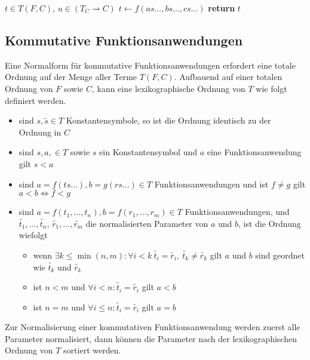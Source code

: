 \documentclass{article}
\begin{document}
\begin{algorithm}
\caption{$\mathrm{flatten} \colon T \times (T_C \rightharpoonup C) \rightarrow T$}\label{flatten}
\begin{algorithmic}[1] %
\Require $t \in T(F, C)$, $u \in (T_C \rightharpoonup C)$
		\State $t \leftarrow f(as..., bs..., cs...)$
	\EndWhile
\EndIf
\State \textbf{return} $t$ 
\end{algorithmic}
\end{algorithm}

\subsection{Kommutative Funktionsanwendungen}
Eine Normalform für kommutative Funktionsanwendungen erfordert eine totale Ordnung auf der Menge aller Terme $T(F, C)$. Aufbauend auf einer totalen Ordnung von $F$ sowie $C$, kann eine lexikographische Ordnung von $T$ wie folgt definiert werden. 
\begin{itemize}
	\item{sind $s, \tilde{s} \in T$ Konstantensymbole, so ist die Ordnung identisch zu der Ordnung in $C$}
	\item{sind $s, a, \in T$ sowie $s$ ein Konstantensymbol und $a$ eine Funktionsanwendung gilt $s < a$ }
	\item{sind $a = f(ts...), b = g(rs...) \in T$ Funktionsanwendungen und ist $f \neq g$ gilt $a < b \iff f < g $}
	\item{sind $a = f(t_1, \dots, t_n), b = f(r_1, \dots, r_m) \in T$ Funktionsanwendungen, und $\tilde{t_1}, \dots, \tilde{t_n}$, $\tilde{r_1}, \dots, \tilde{r_m}$ die normalisierten Parameter von $a$ und $b$, ist die Ordnung wiefolgt}
	\begin{itemize}
		\item{wenn $\exists k \leq \min{(n, m)} \colon \forall i < k ~ \tilde{t_i} = \tilde{r_i} ,~ \tilde{t_k} \neq \tilde{r_k} $ gilt $a$ und $b$ sind geordnet wie $\tilde{t_k}$ und $\tilde{r_k}$}
		\item{ist $n < m$ und $\forall i < n\colon \tilde{t_i} = \tilde{r_i}$ gilt $a < b$}
		\item{ist $n = m$ und $\forall i \leq n\colon \tilde{t_i} = \tilde{r_i}$ gilt $a = b$}
	\end{itemize}
\end{itemize}
Zur Normalisierung einer kommutativen Funktionsanwendung werden zuerst alle Parameter normalisiert, dann können die Parameter nach der lexikographischen Ordnung von $T$ sortiert werden.
\end{document}
